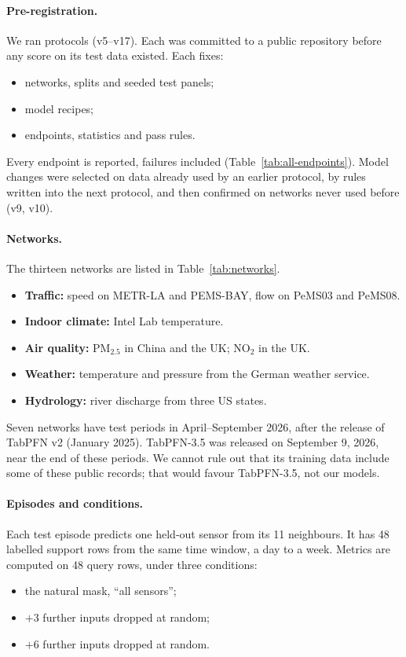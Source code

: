 \paragraph{Pre-registration.} We ran \NumProtocols{} protocols (v5--v17). Each was committed to a public repository
before any score on its test data existed. Each fixes:
\begin{itemize}
  \item networks, splits and seeded test panels;
  \item model recipes;
  \item endpoints, statistics and pass rules.
\end{itemize}
Every endpoint is reported, failures included (Table~\ref{tab:all-endpoints}). Model changes were selected on data
already used by an earlier protocol, by rules written into the next protocol, and then confirmed on networks never
used before (v9, v10).

\paragraph{Networks.} The thirteen networks are listed in Table~\ref{tab:networks}.
\begin{itemize}
  \item \textbf{Traffic:} speed on METR-LA and PEMS-BAY, flow on PeMS03 and PeMS08.
  \item \textbf{Indoor climate:} Intel Lab temperature.
  \item \textbf{Air quality:} PM$_{2.5}$ in China and the UK; NO$_2$ in the UK.
  \item \textbf{Weather:} temperature and pressure from the German weather service.
  \item \textbf{Hydrology:} river discharge from three US states.
\end{itemize}
Seven networks have test periods in April--September 2026, after the release of TabPFN v2 (January 2025).
TabPFN-3.5 was released on September 9, 2026, near the end of these periods. We cannot rule out that its training
data include some of these public records; that would favour TabPFN-3.5, not our models.

\paragraph{Episodes and conditions.} Each test episode predicts one held-out sensor from its 11 neighbours. It has
48 labelled support rows from the same time window, a day to a week. Metrics are computed on 48 query rows, under
three conditions:
\begin{itemize}
  \item the natural mask, ``all sensors'';
  \item $+3$ further inputs dropped at random;
  \item $+6$ further inputs dropped at random.
\end{itemize}

